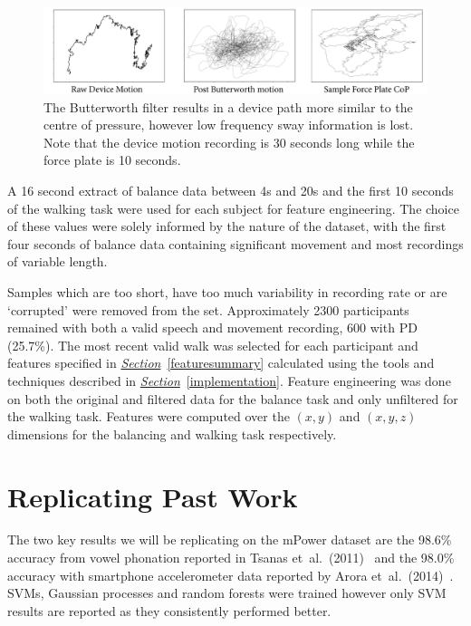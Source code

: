 \documentclass[12pt, twoside]{book}
\begin{document}
\begin{figure}[h]
	\label{butterworth}
	\centering\centerline{\includegraphics[width=1.15\linewidth]{butterworth.png}}
	\caption{The Butterworth filter results in a device path more similar to the centre of pressure, however low frequency sway information is lost. Note that the device motion recording is 30 seconds long while the force plate is 10 seconds.}
\end{figure}

A 16 second extract of balance data between 4s and 20s and the first 10 seconds of the walking task were used for each subject for feature engineering. The choice of these values were solely informed by the nature of the dataset, with the first four seconds of balance data containing significant movement and most recordings of variable length.

Samples which are too short, have too much variability in recording rate or are `corrupted' were removed from the set. Approximately 2300 participants remained with both a valid speech and movement recording, 600 with PD (25.7\%). The most recent valid walk was selected for each participant and features specified in \textit{\hyperref[featuresummary]{Section}}~\ref{featuresummary} calculated using the tools and techniques described in \textit{\hyperref[implementation]{Section}}~\ref{implementation}.  Feature engineering was done on both the original and filtered data for the balance task and only unfiltered for the walking task. Features were computed over the $(x,y)$ and $(x,y,z)$ dimensions for the balancing and walking task respectively.


\section{Replicating Past Work}
\label{pastwork}
The two key results we will be replicating on the mPower dataset are the 98.6\% accuracy from vowel phonation reported in Tsanas et~al.~(2011)~\cite{tsanas2012novel} and the 98.0\% accuracy with smartphone accelerometer data reported by Arora et~al.~(2014)~\cite{arora2014high}. SVMs, Gaussian processes and random forests were trained however only SVM results are reported as they consistently performed better.
\end{document}
